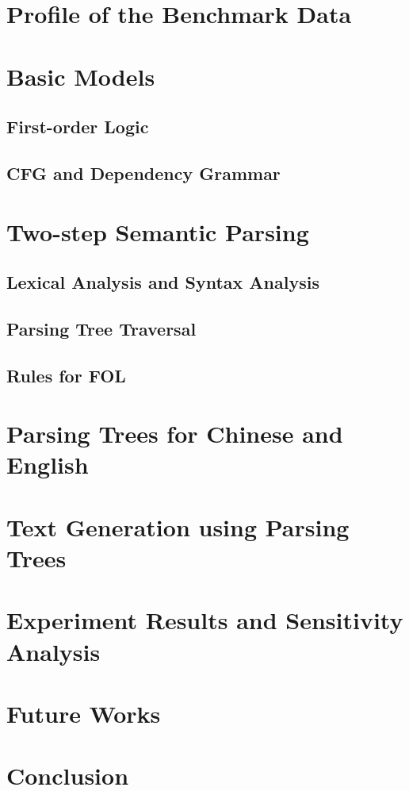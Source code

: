 \documentclass{article}
\begin{document}
\section{Profile of the Benchmark Data}{}

\section{Basic Models}{
	\subsection{First-order Logic}{}

	\subsection{CFG and Dependency Grammar}{}
}

\section{Two-step Semantic Parsing}{
	\subsection{Lexical Analysis and Syntax Analysis}{}

	\subsection{Parsing Tree Traversal}{}

	\subsection{Rules for FOL}{}
}

\section{Parsing Trees for Chinese and English}{}

\section{Text Generation using Parsing Trees}{}

\section{Experiment Results and Sensitivity Analysis}{}

\section{Future Works}{}

\section{Conclusion}{}



\citation
\end{document}
